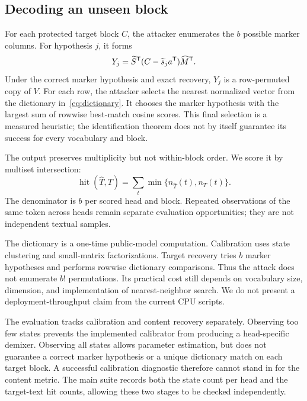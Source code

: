 \subsection{Decoding an unseen block}
For each protected target block $C$, the attacker enumerates the $b$ possible marker columns. For hypothesis $j$, it forms
\begin{equation}
 Y_j=\widetilde S^{\mathsf{T}}(C-\widetilde s_j a^{\mathsf{T}})\widehat M^{\mathsf{T}}.
 \label{eq:decode}
\end{equation}
Under the correct marker hypothesis and exact recovery, $Y_j$ is a row-permuted copy of $V$. For each row, the attacker selects the nearest normalized vector from the dictionary in~\eqref{eq:dictionary}. It chooses the marker hypothesis with the largest sum of rowwise best-match cosine scores. This final selection is a measured heuristic; the identification theorem does not by itself guarantee its success for every vocabulary and block.

The output preserves multiplicity but not within-block order. We score it by multiset intersection:
\begin{equation}
 \operatorname{hit}(\widehat T,T)=\sum_t\min\{n_{\widehat T}(t),n_T(t)\}.
 \label{eq:metric}
\end{equation}
The denominator is $b$ per scored head and block. Repeated observations of the same token across heads remain separate evaluation opportunities; they are not independent textual samples.

The dictionary is a one-time public-model computation. Calibration uses state clustering and small-matrix factorizations. Target recovery tries $b$ marker hypotheses and performs rowwise dictionary comparisons. Thus the attack does not enumerate $b!$ permutations. Its practical cost still depends on vocabulary size, dimension, and implementation of nearest-neighbor search. We do not present a deployment-throughput claim from the current CPU scripts.

The evaluation tracks calibration and content recovery separately. Observing too few states prevents the implemented calibrator from producing a head-specific demixer. Observing all states allows parameter estimation, but does not guarantee a correct marker hypothesis or a unique dictionary match on each target block. A successful calibration diagnostic therefore cannot stand in for the content metric. The main suite records both the state count per head and the target-text hit counts, allowing these two stages to be checked independently.

